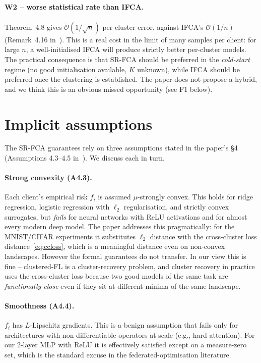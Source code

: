 \paragraph{W2 -- worse statistical rate than IFCA.} Theorem~4.8 gives $\tilde{\mathcal{O}}(1/\sqrt{n})$ per-cluster error, against IFCA's $\tilde{\mathcal{O}}(1/n)$ (Remark~4.16 in~\parencite{vardhan2024srfca}). This is a real cost in the limit of many samples per client: for large $n$, a well-initialised IFCA will produce strictly better per-cluster models. The practical consequence is that SR-FCA should be preferred in the \emph{cold-start} regime (no good initialisation available, $K$ unknown), while IFCA should be preferred once the clustering is established. The paper does not propose a hybrid, and we think this is an obvious missed opportunity (see F1 below).

\section{Implicit assumptions}\label{sec:assumptions}

The SR-FCA guarantees rely on three assumptions stated in the paper's \S 4 (Assumptions 4.3--4.5 in~\parencite{vardhan2024srfca}). We discuss each in turn.

\paragraph{Strong convexity (A4.3).} Each client's empirical risk $f_i$ is assumed $\mu$-strongly convex. This holds for ridge regression, logistic regression with $\ell_2$ regularisation, and strictly convex surrogates, but \emph{fails} for neural networks with ReLU activations and for almost every modern deep model. The paper addresses this pragmatically: for the MNIST/CIFAR experiments it substitutes $\ell_2$ distance with the cross-cluster loss distance~\eqref{eq:ccloss}, which is a meaningful distance even on non-convex landscapes. However the formal guarantees do not transfer. In our view this is fine -- clustered-FL is a cluster-recovery problem, and cluster recovery in practice uses the cross-cluster loss because two good models of the same task are \emph{functionally close} even if they sit at different minima of the same landscape.

\paragraph{Smoothness (A4.4).} $f_i$ has $L$-Lipschitz gradients. This is a benign assumption that fails only for architectures with non-differentiable operators at scale (e.g., hard attention). For our 2-layer MLP with ReLU it is effectively satisfied except on a measure-zero set, which is the standard excuse in the federated-optimisation literature.

